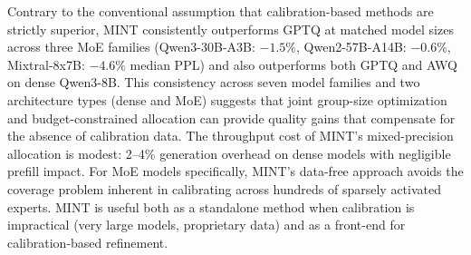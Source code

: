 \documentclass{article}
\begin{document}
Contrary to the conventional assumption that calibration-based methods are strictly superior, MINT consistently outperforms GPTQ at matched model sizes across three MoE families (Qwen3-30B-A3B: $-1.5\%$, Qwen2-57B-A14B: $-0.6\%$, Mixtral-8x7B: $-4.6\%$ median PPL) and also outperforms both GPTQ and AWQ on dense Qwen3-8B. This consistency across seven model families and two architecture types (dense and MoE) suggests that joint group-size optimization and budget-constrained allocation can provide quality gains that compensate for the absence of calibration data. The throughput cost of MINT's mixed-precision allocation is modest: 2--4\% generation overhead on dense models with negligible prefill impact. For MoE models specifically, MINT's data-free approach avoids the coverage problem inherent in calibrating across hundreds of sparsely activated experts. MINT is useful both as a standalone method when calibration is impractical (very large models, proprietary data) and as a front-end for calibration-based refinement.



\end{document}
